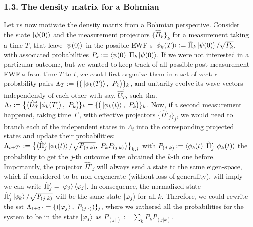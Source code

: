 \documentclass[11pt, a4paper]{article} %
\begin{document}
\subsubsection*{1.3. The density matrix for a Bohmian}\vspace{-0.15cm}
Let us now motivate the density matrix from a Bohmian perspective. Consider the state $\ket{\psi(0)}$ and the measurement projectors $\{\hat{\Pi}_k\}_k$ for a measurement taking a time $T$, that leave $\ket{\psi(0)}$ in the possible EWF-s $\ket{\phi_k(T)}:=\hat{\Pi}_k\ket{\psi(0)}/\sqrt{P_k}$, with associated probabilities $P_k:=\bra{\psi(0)}\Pi_k\ket{\psi(0)}$. If we were not interested in a particular outcome, but we wanted to keep track of all possible post-measurement EWF-s from time $T$ to $t$, we could first organize them in a set of vector-probability pairs $\Lambda_{T}:=\{\big(\ket{\phi_k(T)},\ P_k\big)\}_k$, and unitarily evolve its wave-vectors independently of each other with say, $\hat{U}_{T}^{t}$, such that $\Lambda_{t}:=\big\{\big(\hat{U}^t_T\ket{\phi_k(T)},\ P_k\big)\}_k=\{\big(\ket{\phi_k(t)},\ P_k\big)\}_k$. Now, if a second measurement happened, taking time $T'$, with effective projectors $\{\hat{\Pi}'_j\}_j$, we would need to branch each of the independent states in $\Lambda_t$ into the corresponding projected states and update their probabilities: $\Lambda_{t+T'}:=\big\{ \big(\hat{\Pi}_j'\ket{\phi_k(t)}/\sqrt{P_{(j|k)}},\ P_kP_{(j|k)}\big)\big\}_{k,j}$ with $P_{(j|k)}:=\bra{\phi_k(t)}\hat{\Pi}'_j\ket{\phi_k(t)}$ the probability to get the $j$-th outcome if we obtained the $k$-th one before. Importantly, the projector $\hat{\Pi}'_j$ will always send a state to the same eigen-space, which if considered to be non-degenerate (without loss of generality), will imply we can write $\hat{\Pi}'_j=\ket{\varphi_j}\bra{\varphi_j}$. In consequence, the normalized state $\hat{\Pi}'_j \ket{\phi_k}/\sqrt{P_{(j|k)}}$ will be the same state $\ket{\varphi_j}$ for all $k$. Therefore, we could rewrite the set $\Lambda_{t+T'}=\{(\ket{\varphi_j},\ P_{(j|\cdot)})\}_j$, where we gathered all the probabilities for the system to be in the state $\ket{\varphi_j}$ as $P_{(j|\cdot)}:=\sum_k P_kP_{(j|k)}$.
\end{document}
